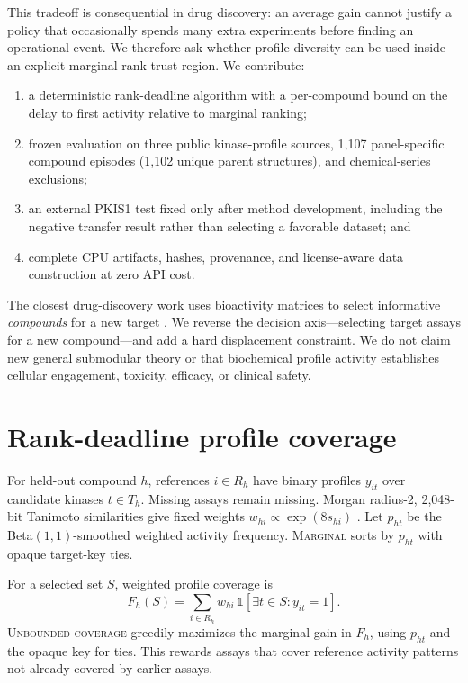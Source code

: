 \documentclass{article}
\begin{document}
This tradeoff is consequential in drug discovery: an average gain cannot
justify a policy that occasionally spends many extra experiments before
finding an operational event. We therefore ask whether profile diversity can be used
inside an explicit marginal-rank trust region. We contribute:

\begin{enumerate}
\item a deterministic rank-deadline algorithm with a per-compound bound on
the delay to first activity relative to marginal ranking;
\item frozen evaluation on three public kinase-profile sources, 1,107
panel-specific compound episodes (1,102 unique parent structures), and
chemical-series exclusions;
\item an external PKIS1 test fixed only after method development, including
the negative transfer result rather than selecting a favorable dataset; and
\item complete CPU artifacts, hashes, provenance, and license-aware data
construction at zero API cost.
\end{enumerate}

The closest drug-discovery work uses bioactivity matrices to select informative
\emph{compounds} for a new target \citep{zhang2019}. We reverse the decision
axis---selecting target assays for a new compound---and add a hard displacement
constraint. We do not claim new general submodular theory or that biochemical
profile activity establishes cellular engagement, toxicity, efficacy, or
clinical safety.

\section{Rank-deadline profile coverage}

For held-out compound $h$, references $i\in R_h$ have binary profiles
$y_{it}$ over candidate kinases $t\in T_h$. Missing assays remain missing.
Morgan radius-2, 2,048-bit Tanimoto similarities give fixed weights
$w_{hi}\propto\exp(8s_{hi})$ \citep{rdkit}. Let $p_{ht}$ be the
Beta$(1,1)$-smoothed weighted activity frequency. \textsc{Marginal} sorts by
$p_{ht}$ with opaque target-key ties.

For a selected set $S$, weighted profile coverage is
\begin{equation}
 F_h(S)=\sum_{i\in R_h}w_{hi}\,
 \mathbb{1}\!\left[\exists t\in S:y_{it}=1\right].
 \label{eq:coverage}
\end{equation}
\textsc{Unbounded coverage} greedily maximizes the marginal gain in
$F_h$, using $p_{ht}$ and the opaque key for ties. This rewards assays that
cover reference activity patterns not already covered by earlier assays.
\end{document}

